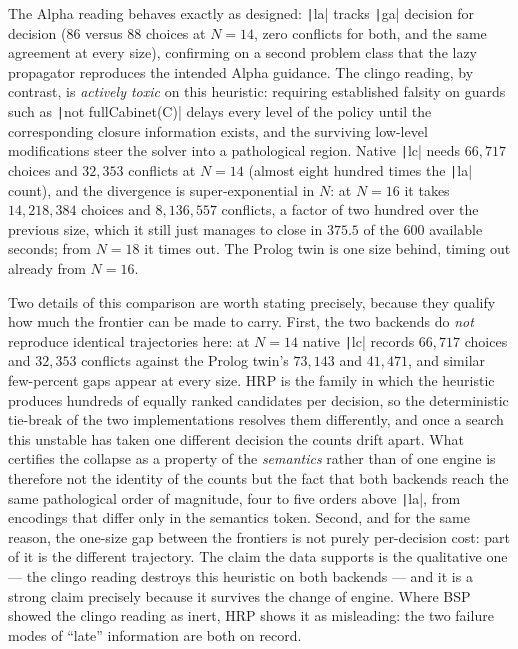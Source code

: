 The Alpha reading behaves exactly as designed: \texttt|la| tracks \texttt|ga| decision for decision (86 versus 88 choices at $N=14$, zero conflicts for both, and the same agreement at every size), confirming on a second problem class that the lazy propagator reproduces the intended Alpha guidance. The clingo reading, by contrast, is \emph{actively toxic} on this heuristic: requiring established falsity on guards such as \texttt|not fullCabinet(C)| delays every level of the policy until the corresponding closure information exists, and the surviving low-level modifications steer the solver into a pathological region. Native \texttt|lc| needs $66{,}717$ choices and $32{,}353$ conflicts at $N=14$ (almost eight hundred times the \texttt|la| count), and the divergence is super-exponential in $N$: at $N=16$ it takes $14{,}218{,}384$ choices and $8{,}136{,}557$ conflicts, a factor of two hundred over the previous size, which it still just manages to close in $375.5$ of the 600 available seconds; from $N=18$ it times out. The Prolog twin is one size behind, timing out already from $N=16$.

Two details of this comparison are worth stating precisely, because they qualify how much the frontier can be made to carry. First, the two backends do \emph{not} reproduce identical trajectories here: at $N=14$ native \texttt|lc| records $66{,}717$ choices and $32{,}353$ conflicts against the Prolog twin's $73{,}143$ and $41{,}471$, and similar few-percent gaps appear at every size. HRP is the family in which the heuristic produces hundreds of equally ranked candidates per decision, so the deterministic tie-break of the two implementations resolves them differently, and once a search this unstable has taken one different decision the counts drift apart. What certifies the collapse as a property of the \emph{semantics} rather than of one engine is therefore not the identity of the counts but the fact that both backends reach the same pathological order of magnitude, four to five orders above \texttt|la|, from encodings that differ only in the semantics token. Second, and for the same reason, the one-size gap between the frontiers is not purely per-decision cost: part of it is the different trajectory. The claim the data supports is the qualitative one --- the clingo reading destroys this heuristic on both backends --- and it is a strong claim precisely because it survives the change of engine. Where BSP showed the clingo reading as inert, HRP shows it as misleading: the two failure modes of \enquote{late} information are both on record.

